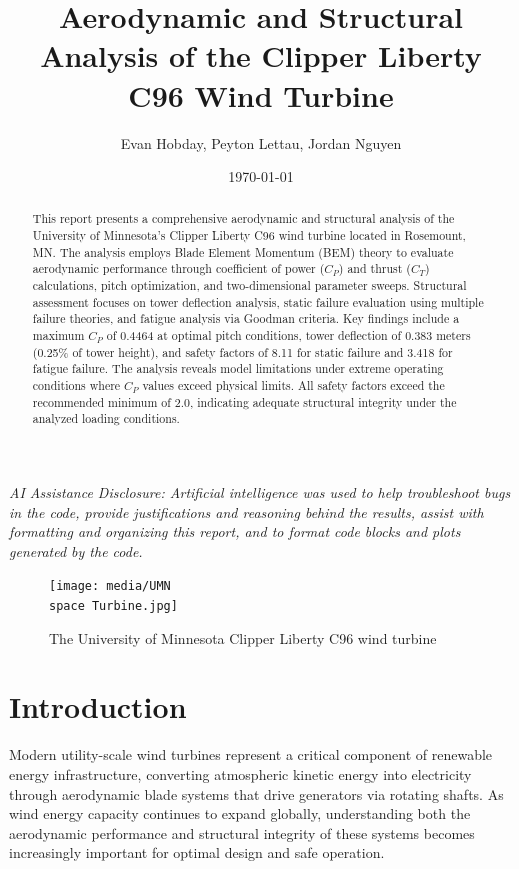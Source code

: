 \documentclass[11pt]{article}
\title{Aerodynamic and Structural Analysis of the Clipper Liberty C96 Wind Turbine}
\author{Evan Hobday, Peyton Lettau, Jordan Nguyen}
\date{\today}
\begin{document}
\maketitle

\begin{center}
\begin{minipage}{0.9\textwidth}
\small\textit{AI Assistance Disclosure: Artificial intelligence was used to help troubleshoot bugs in the code, provide justifications and reasoning behind the results, assist with formatting and organizing this report, and to format code blocks and plots generated by the code.}
\end{minipage}
\end{center}

\begin{abstract}
This report presents a comprehensive aerodynamic and structural analysis of the University of Minnesota's Clipper Liberty C96 wind turbine located in Rosemount, MN. The analysis employs Blade Element Momentum (BEM) theory to evaluate aerodynamic performance through coefficient of power ($C_P$) and thrust ($C_T$) calculations, pitch optimization, and two-dimensional parameter sweeps. Structural assessment focuses on tower deflection analysis, static failure evaluation using multiple failure theories, and fatigue analysis via Goodman criteria. Key findings include a maximum $C_P$ of 0.4464 at optimal pitch conditions, tower deflection of 0.383 meters (0.25\% of tower height), and safety factors of 8.11 for static failure and 3.418 for fatigue failure. The analysis reveals model limitations under extreme operating conditions where $C_P$ values exceed physical limits. All safety factors exceed the recommended minimum of 2.0, indicating adequate structural integrity under the analyzed loading conditions.
\end{abstract}

\begin{figure}[H]
  \centering
  \texttt{[image: media/UMN\\space Turbine.jpg]}
  \caption{The University of Minnesota Clipper Liberty C96 wind turbine}
  \label{fig:umn_turbine_photo}
\end{figure}

\tableofcontents
\newpage

\section{Introduction}

Modern utility-scale wind turbines represent a critical component of renewable energy infrastructure, converting atmospheric kinetic energy into electricity through aerodynamic blade systems that drive generators via rotating shafts. As wind energy capacity continues to expand globally, understanding both the aerodynamic performance and structural integrity of these systems becomes increasingly important for optimal design and safe operation.
\end{document}
